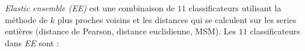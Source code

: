{\em Elastic ensemble (EE)} est une combinaison de $11$ classificateurs utilisant la m\'ethode de $k$ plus proches voisins et les distances qui se calculent sur les series enti\`eres (distance de Pearson, distance euclidienne, MSM).
Les $11$ classificateurs dans {\em EE } sont :
  